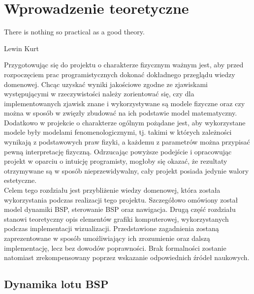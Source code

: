 \section{Wprowadzenie teoretyczne}

\epigraph{There is nothing so practical as a good theory.}{Lewin Kurt}

Przygotowując się do projektu o charakterze fizycznym ważnym jest, aby przed rozpoczęciem prac programistycznych dokonać dokładnego przeglądu wiedzy domenowej. Chcąc uzyskać wyniki jakościowe zgodne ze zjawiskami występującymi w rzeczywistości należy zorientować się, czy dla implementowanych zjawisk znane i wykorzystywane są modele fizyczne oraz czy można w sposób w zwięzły zbudować na ich podstawie model matematyczny. Dodatkowo w projekcie o charakterze ogólnym pożądane jest, aby wykorzystane modele były modelami fenomenologicznymi, tj. takimi w których zależności wynikają z podstawowych praw fizyki, a każdemu z parametrów można przypisać pewną interpretację fizyczną. Odrzucając powyższe podejście i opracowując projekt w oparciu o intuicję programisty, mogłoby się okazać, że rezultaty otrzymywane są w sposób nieprzewidywalny, cały projekt posiada jedynie walory estetyczne.\\

Celem tego rozdziału jest przybliżenie wiedzy domenowej, która została wykorzystania podczas realizacji tego projektu. Szczegółowo omówiony został model dynamiki BSP, sterowanie BSP oraz nawigacja. Drugą część rozdziału stanowi teoretyczny opis elementów grafiki komputerowej, wykorzystanych podczas implementacji wizualizacji. Przedstawione zagadnienia zostaną zaprezentowane w sposób umożliwiający ich zrozumienie oraz dalszą implementację, lecz  bez dowodów poprawności. Brak formalności zostanie natomiast zrekompensowany poprzez wskazanie odpowiednich źródeł naukowych.

\subsection{Dynamika lotu BSP}

